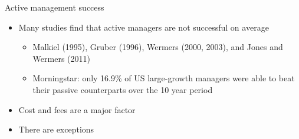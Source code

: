 \documentclass[14pt,xcolor=pdftex,dvipsnames,table]{beamer}\usepackage[]{graphicx}\usepackage[]{color}
\begin{document}
\begin{frame}{Active management success}
\begin{itemize}[<+-| alert@+>]
\pause
\item Many studies find that active managers are not successful on average
\begin{itemize}
\item Malkiel (1995), Gruber (1996), Wermers (2000, 2003), and Jones
and Wermers (2011)
\item Morningstar: only 16.9\% of US large-growth managers were able to beat their passive counterparts over the 10 year period
\end{itemize}
\item Cost and fees are a major factor
\item There are exceptions
\end{itemize}
\end{frame}
\end{document}
